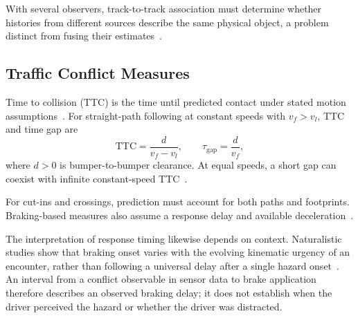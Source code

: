 With several observers, track-to-track association must determine whether
histories from different sources describe the same physical object, a
problem distinct from fusing their estimates~\cite{chong2000association}.

\subsection{Traffic Conflict Measures}
\label{subsec:traffic-conflicts}

Time to collision (TTC) is the time until predicted contact under stated
motion assumptions~\cite{hayward1972near-miss}. For straight-path
following at constant speeds with $v_f>v_l$, TTC and time gap are
\begin{equation}
  \mathrm{TTC}=\frac{d}{v_f-v_l},
  \qquad
  \tau_{\mathrm{gap}}=\frac{d}{v_f},
  \label{eq:ttc-time-gap}
\end{equation}
where $d>0$ is bumper-to-bumper clearance. At equal speeds, a short
gap can coexist with infinite constant-speed TTC~\cite{vogel2003headway}.

For cut-ins and crossings, prediction must account for both paths and
footprints. Braking-based measures also assume a response delay and
available deceleration~\cite{westhofen2023criticality}.

The interpretation of response timing likewise depends on context.
Naturalistic studies show that braking onset varies with the evolving
kinematic urgency of an encounter, rather than following a universal
delay after a single hazard onset~\cite{markkula2016braking}. An interval
from a conflict observable in sensor data to brake application therefore
describes an observed braking delay; it does not establish when the driver
perceived the hazard or whether the driver was distracted.
